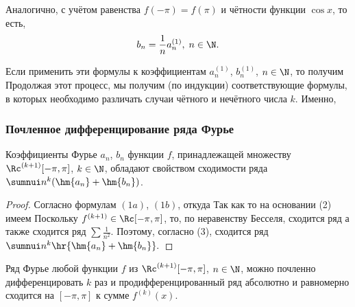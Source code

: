 \documentclass[a4paper]{article}
\newenvironment{lem*}{\par\vskip\theoremskip\textbf{Лемма.}\normalfont \itshape}{\par\vskip\theoremskip}
\begin{document}
Аналогично, с учётом равенства $f(-\pi)=f(\pi)$ и чётности функции
$\cos x$,  то есть, $$b_n=\frac1n
a_n^{(1)}, \; n\in\N.$$

Если применить эти формулы к коэффициентам $a_n^{(1)}$, $b_n^{(1)}$,
$n\in\N$, то получим  Продолжая этот процесс, мы
получим (по индукции) соответствующие формулы, в которых необходимо
различать случаи чётного и нечётного числа $k$. Именно,

\subsubsection{Почленное дифференцирование ряда Фурье}

\begin{lem*}
Коэффициенты Фурье $a_n$, $b_n$ функции $f$, принадлежащей множеству
$\Rc^{(k+1)}[-\pi,\pi]$, $k\in\N$, обладают свойством сходимости
ряда $\sumnui n^k (\hm{a_n} + \hm{b_n})$.
\end{lem*}

\begin{proof}
Согласно формулам $(1a)$, $(1b)$,  откуда  Так
как  то на основании (2) имеем
Поскольку $f^{(k+1)}\in\Rc[-\pi,\pi]$, то, по неравенству Бесселя,
сходится ряд  а также сходится ряд $\sum \frac1{n^2}$.
Поэтому, согласно (3), сходится ряд $\sumnui n^k \hr{\hm{a_n} +
\hm{b_n}}.$
\end{proof}

\begin{theorem}
Ряд Фурье любой функции $f$ из $\Rc^{(k+1)}[-\pi,\pi]$, $n\in\N$,
можно почленно дифференцировать $k$ раз и продифференцированный ряд
абсолютно и равномерно сходится на $[-\pi,\pi]$ к сумме
$f^{(k)}(x)$.
\end{theorem}
\end{document}
